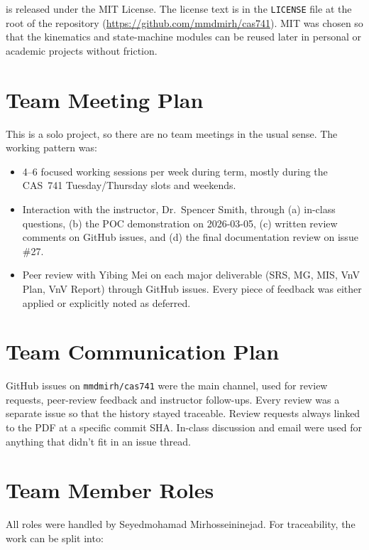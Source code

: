 \documentclass{article}
\begin{document}
\progname{} is released under the MIT License. The license text is in
the \texttt{LICENSE} file at the root of the repository
(\url{https://github.com/mmdmirh/cas741}). MIT was chosen so that the
kinematics and state-machine modules can be reused later in personal
or academic projects without friction.

\section{Team Meeting Plan}

This is a solo project, so there are no team meetings in the usual
sense. The working pattern was:

\begin{itemize}
  \item 4--6 focused working sessions per week during term, mostly
    during the CAS~741 Tuesday/Thursday slots and weekends.
  \item Interaction with the instructor, Dr.\ Spencer Smith, through
    (a) in-class questions, (b) the POC demonstration on 2026-03-05,
    (c) written review comments on GitHub issues, and (d) the final
    documentation review on issue \#27.
  \item Peer review with Yibing Mei on each major deliverable (SRS,
    MG, MIS, VnV Plan, VnV Report) through GitHub issues. Every piece
    of feedback was either applied or explicitly noted as deferred.
\end{itemize}

\section{Team Communication Plan}

GitHub issues on \texttt{mmdmirh/cas741} were the main channel, used
for review requests, peer-review feedback and instructor follow-ups.
Every review was a separate issue so that the history stayed
traceable. Review requests always linked to the PDF at a specific
commit SHA. In-class discussion and email were used for anything that
didn't fit in an issue thread.

\section{Team Member Roles}

All roles were handled by Seyedmohamad Mirhosseininejad. For
traceability, the work can be split into:
\end{document}
